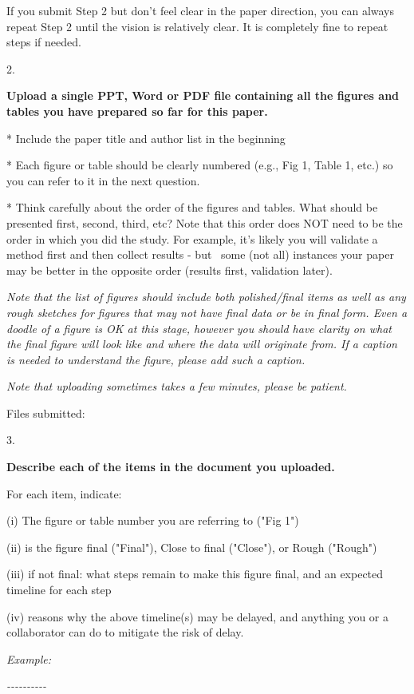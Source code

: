 \documentclass[]{article}
\begin{document}
If you submit Step 2 but don't feel clear in the paper direction, you
can always repeat Step 2 until the vision is relatively clear. It is
completely fine to repeat steps if needed.

2.

\textbf{Upload a single PPT, Word or PDF file containing all the figures
and tables you have prepared so far for this paper.}~

* Include the paper title and author list in the beginning

* Each figure or table should be clearly numbered (e.g., Fig 1, Table 1,
etc.) so you can refer to it in the next question.

* Think carefully about the order of the figures and tables. What should
be presented first, second, third, etc? Note that this order does NOT
need to be the order in which you did the study. For example, it's
likely you will validate a method first and then collect results - but
~some (not all) instances your paper may be better in the opposite order
(results first, validation later).

\emph{Note that the list of figures should include both polished/final
items as well as any rough sketches for figures that may not have final
data or be in final form. Even a doodle of a figure is OK at this stage,
however you should have clarity on what the final figure will look like
and where the data will originate from. If a caption is needed to
understand the figure, please add such a caption.}

\emph{Note that uploading sometimes takes a few minutes, please be
patient.}~

Files submitted:

3.

\textbf{Describe each of the items in the document you uploaded.}

For each item, indicate:

(i) The figure or table number you are referring to ("Fig 1")

(ii) is the figure final ("Final"), Close to final ("Close"), or Rough
("Rough")

(iii) if not final: what steps remain to make this figure final, and an
expected timeline for each step

(iv) reasons why the above timeline(s) may be delayed, and anything you
or a collaborator can do to mitigate the risk of delay.

\emph{Example:}

\emph{-\/-\/-\/-\/-\/-\/-\/-\/-\/-}
\end{document}
